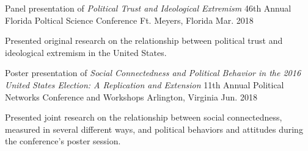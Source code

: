 

\begin{cventries}

  \cventry
    {Panel presentation of \emph{Political Trust and Ideological Extremism}} %
    {46th Annual Florida Poltical Science Conference} %
    {Ft. Meyers, Florida} %
    {Mar. 2018} %
    {
      \begin{cvitems} %
        \item {Presented original research on the relationship between political trust and ideological extremism in the United States.}
      \end{cvitems}
    }

  \cventry
    {Poster presentation of \emph{Social Connectedness and Political Behavior in the 2016 United States Election: A Replication and Extension}} %
    {11th Annual Political Networks Conference and Workshops} %
    {Arlington, Virginia} %
    {Jun. 2018} %
    {
      \begin{cvitems} %
        \item {Presented joint research on the relationship between social connectedness, measured in several different ways, and political behaviors and attitudes during the conference's poster session.}
      \end{cvitems}
    }

\end{cventries}
